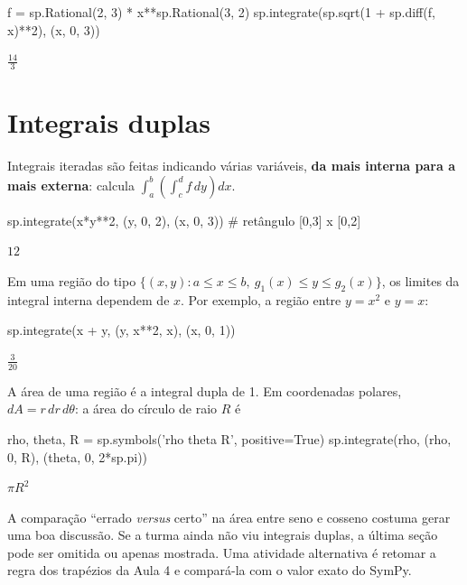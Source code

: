 \begin{entrada}
f = sp.Rational(2, 3) * x**sp.Rational(3, 2)
sp.integrate(sp.sqrt(1 + sp.diff(f, x)**2), (x, 0, 3))
\end{entrada}
\begin{saidamat}
$\displaystyle \frac{14}{3}$
\end{saidamat}

\section{Integrais duplas}

Integrais iteradas são feitas indicando várias variáveis, \textbf{da mais interna para a mais externa}:
 calcula $\int_a^b\!\left(\int_c^d f\,dy\right)dx$.

\begin{entrada}
sp.integrate(x*y**2, (y, 0, 2), (x, 0, 3))         # retângulo [0,3] x [0,2]
\end{entrada}
\begin{saidamat}
$\displaystyle 12$
\end{saidamat}

Em uma região do tipo $\{(x,y): a\le x\le b,\ g_1(x)\le y\le g_2(x)\}$, os limites da integral interna dependem
de $x$. Por exemplo, a região entre $y=x^2$ e $y=x$:

\begin{entrada}
sp.integrate(x + y, (y, x**2, x), (x, 0, 1))
\end{entrada}
\begin{saidamat}
$\displaystyle \frac{3}{20}$
\end{saidamat}

A área de uma região é a integral dupla de 1. Em coordenadas polares, $dA=r\,dr\,d\theta$: a área do círculo de raio
$R$ é

\begin{entrada}
rho, theta, R = sp.symbols('rho theta R', positive=True)
sp.integrate(rho, (rho, 0, R), (theta, 0, 2*sp.pi))
\end{entrada}
\begin{saidamat}
$\displaystyle \pi R^{2}$
\end{saidamat}

\begin{professor}
A comparação ``errado \emph{versus} certo'' na área entre seno e cosseno costuma gerar uma boa discussão. Se a
turma ainda não viu integrais duplas, a última seção pode ser omitida ou apenas mostrada. Uma atividade
alternativa é retomar a regra dos trapézios da Aula 4 e compará-la com o valor exato do SymPy.
\end{professor}

